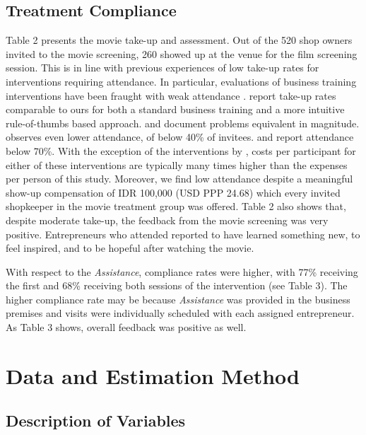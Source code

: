\documentclass[11.5pt]{article}
\begin{document}
\subsection{Treatment Compliance}

Table 2 presents the movie take-up and assessment. Out of the 520 shop owners invited to the movie screening, 260 showed up at the venue for the film screening session. This is in line with previous experiences of low take-up rates for interventions requiring attendance. In particular, evaluations of business training interventions have been fraught with weak attendance \citep[for a review, see][]{McKenzie2014}. \citet{Drexler2014} report take-up rates comparable to ours for both a standard business training and a more intuitive rule-of-thumbs based approach. \citet{Gine2014} and \citet{Bruhn2017} document problems equivalent in magnitude. \citet{Bruhn2013} observes even lower attendance, of below 40\% of invitees. \citet{Calderon2013} and \citet{Premand2016} report attendance below 70\%. With the exception of the interventions by \citet{Drexler2014}, costs per participant for either of these interventions are typically many times higher than the expenses per person of this study. Moreover, we find low attendance despite a meaningful show-up compensation of IDR 100,000 (USD PPP 24.68) which every invited shopkeeper in the movie treatment group was offered. %
Table 2 also shows that, despite moderate take-up, the feedback from the movie screening was very positive. Entrepreneurs who attended reported to have learned something new, to feel inspired, and to be hopeful after watching the movie.

With respect to the \emph{Assistance}, compliance rates were higher, with 77\% receiving the first and 68\% receiving both sessions of the intervention (see Table 3). The higher compliance rate may be because \emph{Assistance} was provided in the business premises and visits were individually scheduled with each assigned entrepreneur. As Table 3 shows, overall feedback was positive as well.

\section{Data and Estimation Method}\label{sec.data}

\subsection{Description of Variables}
\end{document}
